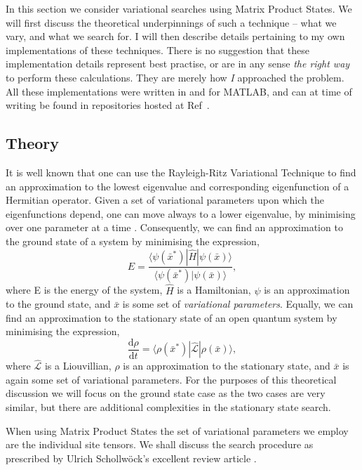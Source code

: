 In this section we consider variational searches using Matrix Product States. We will first discuss the theoretical underpinnings of such a technique -- what we vary, and what we search for. I will then describe details pertaining to my own implementations of these techniques. There is no suggestion that these implementation details represent best practise, or are in any sense \emph{the right way} to perform these calculations. They are merely how \emph{I} approached the problem. All these implementations were written in and for MATLAB, and can at time of writing be found in repositories hosted at Ref~\cite{otb:githome}.
 
 \subsection{Theory}
It is well known that one can use the Rayleigh-Ritz Variational Technique to find an approximation to the lowest eigenvalue and corresponding eigenfunction of a Hermitian operator. Given a set of variational parameters upon which the eigenfunctions depend, one can move always to a lower eigenvalue, by minimising over one parameter at a time \cite{ArfWeb_RRVT, Gasiorowicz_RVT}. Consequently, we can find an approximation to the ground state of a system by minimising the expression,
\begin{equation}
E = \frac{\langle \psi (\bar{x}^{*}) | \hat{H} | \psi (\bar{x}) \rangle}{\langle \psi (\bar{x}^{*}) | \psi (\bar{x}) \rangle},
\label{eq:vs1-1}
\end{equation}
where E is the energy of the system, \(\hat{H}\) is a Hamiltonian, \(\psi\) is an approximation to the ground state, and \( \bar{x} \) is some set of \emph{variational parameters}. Equally, we can find an approximation to the stationary state of an open quantum system by minimising the expression,
\begin{equation}
\frac{\mathrm{d}\rho}{\mathrm{d}t} = \langle \rho(\bar{x}^{*}) | \hat{\mathcal{L}} | \rho(\bar{x}) \rangle,
\label{eq:vs1-2}
\end{equation}
where \(\hat{\mathcal{L}}\) is a Liouvillian, \(\rho\) is an approximation to the stationary state, and \(\bar{x}\) is again some set of variational parameters. For the purposes of this theoretical discussion we will focus on the ground state case as the two cases are very similar, but there are additional complexities in the stationary state search. 

When using Matrix Product States the set of variational parameters we employ are the individual site tensors. We shall discuss the search procedure as prescribed by Ulrich Schollw\"{o}ck's excellent review article \cite{Schollwoeck11}.

